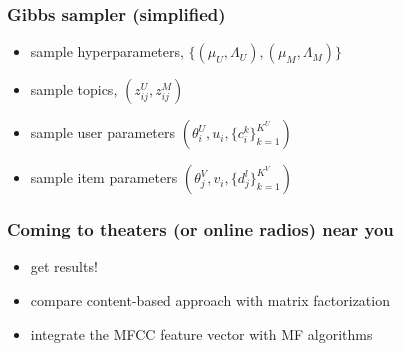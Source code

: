 \documentclass{beamer}
\begin{document}
\begin{frame}
	\frametitle{Gibbs sampler (simplified)}
	\begin{itemize}
		\item sample hyperparameters, $\{(\mu_U, \Lambda_U), (\mu_M, \Lambda_M)\}$
		\item sample topics, $(z_{ij}^U, z_{ij}^M)$
		\item sample user parameters $(\theta_i^U, u_i, \{c_i^k\}_{k=1}^{K^U})$
		\item sample item parameters $(\theta_j^V, v_i, \{d_j^l\}_{k=1}^{K^V})$

	\end{itemize}
\end{frame}

\begin{frame}
	\frametitle{Coming to theaters (or online radios) near you}
	
	\begin{itemize}	
		\item get results!		
		\item compare content-based approach with matrix factorization	
		\item integrate the MFCC feature vector with MF algorithms
	\end{itemize}
\end{frame}
\end{document}
